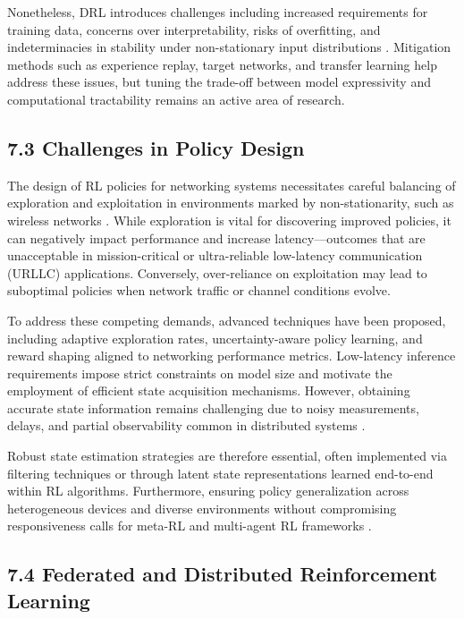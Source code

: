\documentclass[11pt]{article}
\begin{document}
\begin{itemize}
Nonetheless, DRL introduces challenges including increased requirements for training data, concerns over interpretability, risks of overfitting, and indeterminacies in stability under non-stationary input distributions \cite{ref13}. Mitigation methods such as experience replay, target networks, and transfer learning help address these issues, but tuning the trade-off between model expressivity and computational tractability remains an active area of research.

\subsection{7.3 Challenges in Policy Design}

The design of RL policies for networking systems necessitates careful balancing of exploration and exploitation in environments marked by non-stationarity, such as wireless networks \cite{ref3, ref6, ref14, ref48}. While exploration is vital for discovering improved policies, it can negatively impact performance and increase latency—outcomes that are unacceptable in mission-critical or ultra-reliable low-latency communication (URLLC) applications. Conversely, over-reliance on exploitation may lead to suboptimal policies when network traffic or channel conditions evolve.

To address these competing demands, advanced techniques have been proposed, including adaptive exploration rates, uncertainty-aware policy learning, and reward shaping aligned to networking performance metrics. Low-latency inference requirements impose strict constraints on model size and motivate the employment of efficient state acquisition mechanisms. However, obtaining accurate state information remains challenging due to noisy measurements, delays, and partial observability common in distributed systems \cite{ref3}.

Robust state estimation strategies are therefore essential, often implemented via filtering techniques or through latent state representations learned end-to-end within RL algorithms. Furthermore, ensuring policy generalization across heterogeneous devices and diverse environments without compromising responsiveness calls for meta-RL and multi-agent RL frameworks \cite{ref14}.

\subsection{7.4 Federated and Distributed Reinforcement Learning}


\end{itemize}
\end{document}
